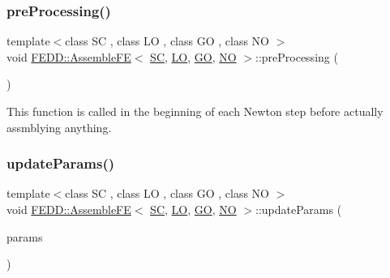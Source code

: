 \mbox{\label{classFEDD_1_1AssembleFE_a7bfb3f6b49f102b0856551d62c8c8a9f}} 
\subsubsection{\texorpdfstring{pre\+Processing()}{preProcessing()}}
{\footnotesize\ttfamily template$<$class SC , class LO , class GO , class NO $>$ \\
void \hyperlink{classFEDD_1_1AssembleFE}{F\+E\+D\+D\+::\+Assemble\+FE}$<$ \hyperlink{fe__test__laplace_8cpp_a79c7e86a57edbb2a5a53242bcd04e41e}{SC}, \hyperlink{fe__test__laplace_8cpp_ad6a38c9f07d3fd633eefca5bccad8410}{LO}, \hyperlink{fe__test__laplace_8cpp_afa2946b509009b4f45eb04bd8c5b27d9}{GO}, \hyperlink{fe__test__laplace_8cpp_a5e24f37b28787429872b6ecb1d0417ce}{NO} $>$\+::pre\+Processing (\begin{DoxyParamCaption}{ }\end{DoxyParamCaption})}



This function is called in the beginning of each Newton step before actually assmblying anything. 

\mbox{\label{classFEDD_1_1AssembleFE_a48ea6d9259f538a88fa5b21667869bce}} 
\subsubsection{\texorpdfstring{update\+Params()}{updateParams()}}
{\footnotesize\ttfamily template$<$class SC , class LO , class GO , class NO $>$ \\
void \hyperlink{classFEDD_1_1AssembleFE}{F\+E\+D\+D\+::\+Assemble\+FE}$<$ \hyperlink{fe__test__laplace_8cpp_a79c7e86a57edbb2a5a53242bcd04e41e}{SC}, \hyperlink{fe__test__laplace_8cpp_ad6a38c9f07d3fd633eefca5bccad8410}{LO}, \hyperlink{fe__test__laplace_8cpp_afa2946b509009b4f45eb04bd8c5b27d9}{GO}, \hyperlink{fe__test__laplace_8cpp_a5e24f37b28787429872b6ecb1d0417ce}{NO} $>$\+::update\+Params (\begin{DoxyParamCaption}\item[{Parameter\+List\+Ptr\+\_\+\+Type}]{params }\end{DoxyParamCaption})\hspace{0.3cm}{\ttfamily [virtual]}}



